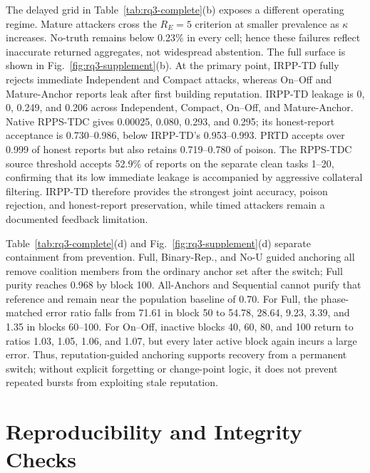 \documentclass[journal]{IEEEtran}
\begin{document}
The delayed grid in Table~\ref{tab:rq3-complete}(b) exposes a different operating
regime. Mature attackers cross the $R_E=5$ criterion at smaller prevalence as
$\kappa$ increases. No-truth remains below 0.23\% in every cell; hence these
failures reflect inaccurate returned aggregates, not widespread abstention.
The full surface is shown in Fig.~\ref{fig:rq3-supplement}(b). At the primary
point, IRPP-TD fully rejects immediate Independent and Compact attacks, whereas
On--Off and Mature-Anchor reports leak after first building reputation.
IRPP-TD leakage is 0, 0, 0.249, and 0.206 across Independent, Compact, On--Off,
and Mature-Anchor. Native RPPS-TDC gives 0.00025, 0.080, 0.293, and 0.295;
its honest-report acceptance is 0.730--0.986, below IRPP-TD's 0.953--0.993.
PRTD accepts over 0.999 of honest reports but also retains 0.719--0.780 of
poison. The RPPS-TDC source threshold accepts 52.9\% of reports on the separate
clean tasks 1--20, confirming that its low immediate leakage is accompanied by
aggressive collateral filtering. IRPP-TD therefore provides the strongest
joint accuracy, poison rejection, and honest-report preservation, while timed
attackers remain a documented feedback limitation.

Table~\ref{tab:rq3-complete}(d) and Fig.~\ref{fig:rq3-supplement}(d) separate
containment from prevention. Full,
Binary-Rep., and No-U guided anchoring all remove coalition members from the
ordinary anchor set after the switch; Full purity reaches 0.968 by block 100.
All-Anchors and Sequential cannot purify that reference and remain near the
population baseline of 0.70. For Full, the phase-matched error ratio falls from
71.61 in block 50 to 54.78, 28.64, 9.23, 3.39, and 1.35 in blocks
60--100. For On--Off, inactive blocks 40, 60, 80, and 100 return to ratios
1.03, 1.05, 1.06, and 1.07, but every later active block again incurs a large error.
Thus, reputation-guided anchoring supports recovery from a permanent switch;
without explicit forgetting or change-point logic, it does not prevent repeated
bursts from exploiting stale reputation.

\section{Reproducibility and Integrity Checks}
\label{app:rq3-reproducibility}
\end{document}
